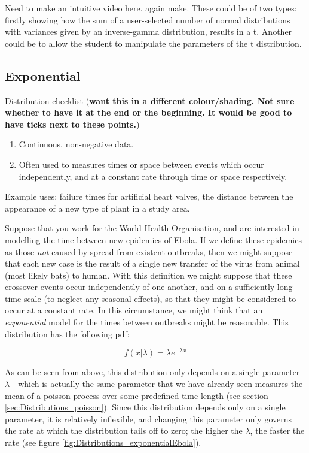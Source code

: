 \documentclass[11pt,fullpage]{book}
\begin{document}
 Need to make an intuitive video here.
 again make. These could be of two types: firstly showing how the sum of a user-selected number of normal distributions with variances given by an inverse-gamma distribution, results in a t. Another could be to allow the student to manipulate the parameters of the t distribution.

\subsection{Exponential}
Distribution checklist (\textbf{want this in a different colour/shading. Not sure whether to have it at the end or the beginning. It would be good to have ticks next to these points.})

\begin{enumerate} 
\item Continuous, non-negative data.
\item Often used to measures times or space between events which occur independently, and at a constant rate through time or space respectively.
\end{enumerate}

Example uses: failure times for artificial heart valves, the distance between the appearance of a new type of plant in a study area. 

Suppose that you work for the World Health Organisation, and are interested in modelling the time between new epidemics of Ebola. If we define these epidemics as those \textit{not} caused by spread from existent outbreaks, then we might suppose that each new case is the result of a single new transfer of the virus from animal (most likely bats) to human. With this definition we might suppose that these crossover events occur independently of one another, and on a sufficiently long time scale (to neglect any seasonal effects), so that they might be considered to occur at a constant rate. In this circumstance, we might think that an \textit{exponential} model for the times between outbreaks might be reasonable. This distribution has the following pdf:

\begin{equation}
f(x|\lambda) = \lambda e^{-\lambda x}
\end{equation}

As can be seen from above, this distribution only depends on a single parameter $\lambda$ - which is actually the same parameter that we have already seen measures the mean of a poisson process over some predefined time length (see section \ref{sec:Distributions_poisson}). Since this distribution depends only on a single parameter, it is relatively inflexible, and changing this parameter only governs the rate at which the distribution tails off to zero; the higher the $\lambda$, the faster the rate (see figure \ref{fig:Distributions_exponentialEbola}).
\end{document}
